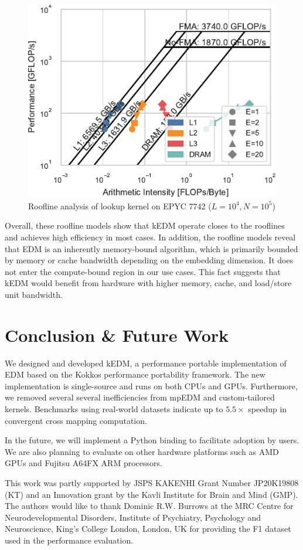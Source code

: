 \documentclass[sigconf]{acmart}
\begin{document}
\begin{figure}
    \centering
    \includegraphics[width=.9\linewidth]{figs/roofline_lookup_wo_rho_epyc}
    \caption{Roofline analysis of lookup kernel on EPYC 7742 ($L=10^4, N=10^5$)}%
    \label{fig:roofline-lookup-eypc}
\end{figure}

Overall, these roofline models show that kEDM operate closes to the rooflines
and achieves high efficiency in most cases. In addition, the roofline models
reveal that EDM is an inherently memory-bound algorithm, which is primarily
bounded by memory or cache bandwidth depending on the embedding dimension. It
does not enter the compute-bound region in our use cases. This fact suggests
that kEDM would benefit from hardware with higher memory, cache, and
load/store unit bandwidth.

\section{Conclusion \& Future Work}\label{sec:conclusion}

We designed and developed kEDM, a performance portable implementation of EDM
based on the Kokkos performance portability framework. The new implementation
is single-source and runs on both CPUs and GPUs. Furthermore, we removed several
several inefficiencies from mpEDM and custom-tailored kernels. Benchmarks using real-world datasets indicate up to $5.5\times$
speedup in convergent cross mapping computation.

In the future, we will implement a Python binding to facilitate adoption by
users. We are also planning to evaluate on other hardware platforms such as AMD GPUs and Fujitsu A64FX ARM processors.

\begin{acks}
This work was partly supported by JSPS KAKENHI Grant Number JP20K19808 (KT) and an
Innovation grant by the Kavli Institute for Brain and Mind (GMP). The authors would like to thank Dominic R.W. Burrows at the MRC Centre for Neurodevelopmental Disorders, Institute of Psychiatry, Psychology and Neuroscience, King's College London, London, UK for providing the F1 dataset used in the performance evaluation.
\end{acks}



\end{document}
